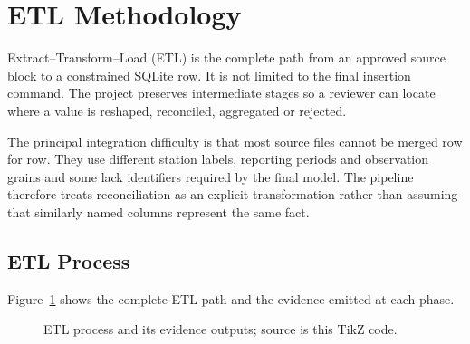 \section{ETL Methodology}
\label{sec:etl}

Extract--Transform--Load (ETL) is the complete path from an approved source
block to a constrained SQLite row. It is not limited to the final insertion
command. The project preserves intermediate stages so a reviewer can locate
where a value is reshaped, reconciled, aggregated or rejected.

The principal integration difficulty is that most source files cannot be
merged row for row. They use different station labels, reporting periods and
observation grains and some lack identifiers required by the final model. The
pipeline therefore treats reconciliation as an explicit transformation rather
than assuming that similarly named columns represent the same fact.

\subsection{ETL Process}
\label{subsec:etl-process}

Figure~\ref{fig:etl-pipeline} shows the complete ETL path and the evidence
emitted at each phase.

\begin{figure}[H]
\centering
{}
\caption{ETL process and its evidence outputs; source is this TikZ code.}
\label{fig:etl-pipeline}
\end{figure}

